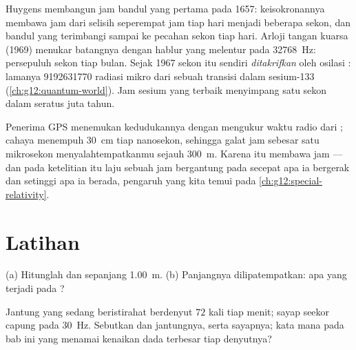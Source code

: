 \begin{example}\label{ex:g12:oscillators-and-time:clocks}
Huygens membangun jam bandul yang pertama pada \num{1657}: keisokronannya
membawa jam dari selisih seperempat jam tiap hari menjadi beberapa sekon, dan
bandul yang terimbangi sampai ke pecahan sekon tiap hari. Arloji tangan
kuarsa (\num{1969}) menukar batangnya dengan hablur yang melentur pada
\qty{32768}{Hz}: persepuluh sekon tiap bulan. Sejak \num{1967} sekon
itu sendiri \emph{ditakrifkan} oleh osilasi : lamanya
\num{9192631770}  radiasi  mikro dari sebuah
transisi dalam sesium-133 (\cref{ch:g12:quantum-world}). Jam
sesium yang terbaik menyimpang satu sekon dalam seratus juta tahun.
\end{example}

\begin{remark}\label{rem:g12:oscillators-and-time:gps}
Penerima GPS menemukan kedudukannya dengan mengukur waktu  radio dari
; cahaya menempuh \qty{30}{cm} tiap nanosekon, sehingga galat jam
sebesar satu mikrosekon menyalahtempatkanmu sejauh \qty{300}{m}. Karena itu
 membawa jam  --- dan pada ketelitian itu laju sebuah
jam bergantung pada secepat apa ia bergerak dan setinggi apa ia berada,
pengaruh yang kita temui pada \cref{ch:g12:special-relativity}.
\end{remark}

\section{Latihan}

\begin{exercise}[$\star$]\label{exo:g12:oscillators-and-time:1}
(a) Hitunglah  dan   sepanjang \qty{1.00}{m}.
(b) Panjangnya dilipatempatkan: apa yang terjadi pada ?
\end{exercise}

\begin{exercise}[$\star$]\label{exo:g12:oscillators-and-time:2}
Jantung yang sedang beristirahat berdenyut $72$ kali tiap menit; sayap
seekor capung pada \qty{30}{Hz}. Sebutkan  dan  jantungnya,
serta  sayapnya; kata mana pada bab ini yang menamai kenaikan dada
terbesar tiap denyutnya?
\end{exercise}


